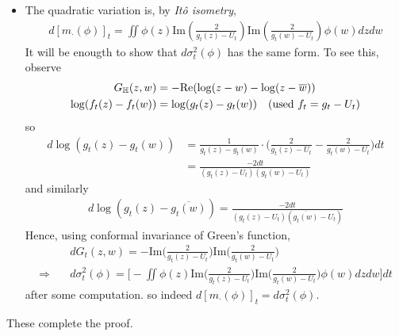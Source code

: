 \documentclass[12pt,a4paper]{article}
\newenvironment{proof}
{\begin{changemargin}{0.5cm}{0.5cm} 
	}%
	{\end{changemargin}
}
\renewenvironment{i}
{\begin{itemize} 
	}%
	{\end{itemize}
}
\newenvironment{p}
{\begin{proof} 
	}%
	{\end{proof}
}
\begin{document}
\begin{p}
\begin{i}
\item The quadratic variation is, by \emph{It\^o isometry},
\begin{align*}
d[m_{\cdot}(\phi)]_t = \iint \phi(z) \text{Im}(\frac{2}{g_t(z)- U_t}) \text{Im}(\frac{2}{g_t(w)- U_t})\phi(w) dzdw
\end{align*}
It will be enougth to show that $d\sigma_t^2(\phi)$ has the same form. To see this, observe
\begin{align*}
G_{\mathbb{H}}(z,w) &= - \text{Re}(\log(z-w) - \log(z-\overline{w})) \\
\log (f_t(z) - f_t(w)) &= \log (g_t(z) - g_t(w)) \quad (\text{used }f_t = g_t- U_t)
\end{align*}
so
\begin{align*}
d \log (g_t(z) - g_t(w)) &= \frac{1}{g_t(z) - g_t(w)} \cdot \Big( \frac{2}{g_t(z) - U_t} -\frac{2}{g_t(w)-U_t} \Big) dt \\
&=\frac{-2dt}{(g_t(z) - U_t)(g_t(w) - U_t)}
\end{align*}
and similarly
\begin{align*}
d\log (g_t(z) - \overline{g_t(w)}) = \frac{-2dt}{(g_t(z) - U_t)(\overline{g_t(w)} - U_t)}
\end{align*}
Hence, using conformal invariance of Green's function,
\begin{align*}
& dG_t(z,w) = -\text{Im}\Big( \frac{2}{g_t(z) - U_t} \Big) \text{Im}\Big(\frac{2}{g_t(w) - U_t} \Big) \\
\Rightarrow \quad & d\sigma_t^2(\phi) = \Big[ -\iint \phi(z) \text{Im}\big(\frac{2}{g_t(z) - U_t}\big) \text{Im}\big(\frac{2}{g_t(w) - U_t}\big) \phi(w) dzdw\Big]dt
\end{align*}
after some computation. so indeed $d[m_{\cdot}(\phi)]_t = d\sigma_t^2(\phi)$.
\end{i} 
These complete the proof.

\eop
\end{p}
\end{document}
